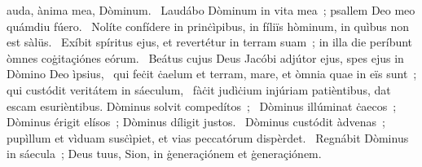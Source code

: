 \psalmChapterWithInscription{}
{ }
{%
auda, ànima mea, Dòminum. 
~Laudábo Dòminum in vita mea~; psallem Deo meo quámdiu fúero. 
~Nolíte confídere in prinċìpibus, in fíliïs hòminum, in quìbus non est sàlüs. 
~Exíbit spíritus ejus, et revertétur in terram suam~; in illa die períbunt òmnes coġitaçiónes eórum. 
~Beátus cujus Deus Jacóbi adjútor ejus, spes ejus in Dòmino Deo ìpsius, 
~qui feċit ċaelum et terram, mare, et òmnia quae in eïs sunt~; qui custódit veritátem in sáeculum, 
~fàċit judìċium injúriam patièntibus, dat escam esurièntibus. Dòminus solvit compedítos~; 
~Dòminus illúminat ċaecos~; Dòminus érigit elísos~; Dòminus díligit justos. 
~Dòminus custódit àdvenas~; pupìllum et vìduam susċìpiet, et vias peccatórum dispèrdet. 
~Regnábit Dòminus in sáecula~; Deus tuus, Sion, in ġeneraçiónem et ġeneraçiónem. 
}
